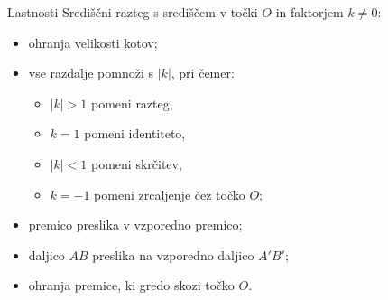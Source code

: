         
        \begin{frame}
            \begin{block}{Lastnosti}
                Središčni razteg s središčem v točki $O$ in faktorjem $k\neq 0$:
                \begin{itemize}
                    \item ohranja velikosti kotov;
                    \item vse razdalje pomnoži s $|k|$, pri čemer:
                        \begin{itemize}
                            \item $|k|>1$ pomeni razteg,
                            \item $k=1$ pomeni identiteto,
                            \item $|k|<1$ pomeni skrčitev,
                            \item $k=-1$ pomeni zrcaljenje čez točko $O$;
                        \end{itemize}
                    \item premico preslika v vzporedno premico;
                    \item daljico $AB$ preslika na vzporedno daljico $A'B'$;
                    \item ohranja premice, ki gredo skozi točko $O$.
                \end{itemize}
            \end{block}
        \end{frame}


